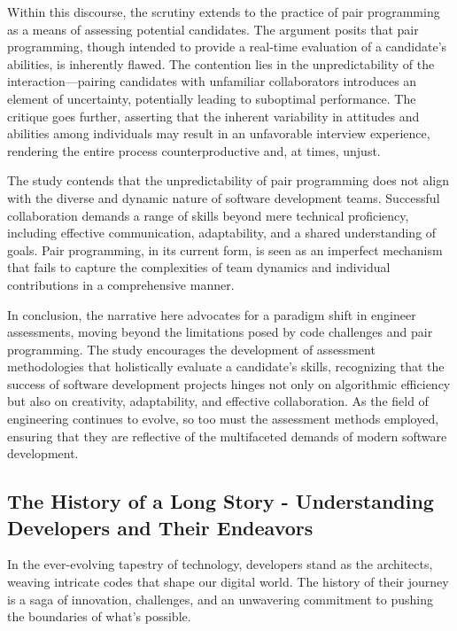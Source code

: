 \documentclass[
    a4paper, %
    10pt, %
    unnumberedsections, %
    twoside, %
]{LTJournalArticle}
\begin{document}
Within this discourse, the scrutiny extends to the practice of pair programming as a means of assessing potential candidates. The argument posits that pair programming, though intended to provide a real-time evaluation of a candidate's abilities, is inherently flawed. The contention lies in the unpredictability of the interaction—pairing candidates with unfamiliar collaborators introduces an element of uncertainty, potentially leading to suboptimal performance. The critique goes further, asserting that the inherent variability in attitudes and abilities among individuals may result in an unfavorable interview experience, rendering the entire process counterproductive and, at times, unjust.

The study contends that the unpredictability of pair programming does not align with the diverse and dynamic nature of software development teams. Successful collaboration demands a range of skills beyond mere technical proficiency, including effective communication, adaptability, and a shared understanding of goals. Pair programming, in its current form, is seen as an imperfect mechanism that fails to capture the complexities of team dynamics and individual contributions in a comprehensive manner.

In conclusion, the narrative here advocates for a paradigm shift in engineer assessments, moving beyond the limitations posed by code challenges and pair programming. The study encourages the development of assessment methodologies that holistically evaluate a candidate's skills, recognizing that the success of software development projects hinges not only on algorithmic efficiency but also on creativity, adaptability, and effective collaboration. As the field of engineering continues to evolve, so too must the assessment methods employed, ensuring that they are reflective of the multifaceted demands of modern software development.









\subsection{The History of a Long Story - Understanding Developers and Their Endeavors}

In the ever-evolving tapestry of technology, developers stand as the architects, weaving intricate codes that shape our digital world. The history of their journey is a saga of innovation, challenges, and an unwavering commitment to pushing the boundaries of what's possible.
\end{document}
